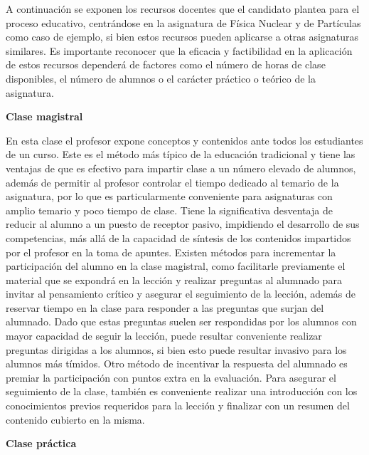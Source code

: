 \documentclass[a4paper,12pt,twoside]{article}
\begin{document}
A continuación se exponen los recursos docentes que el candidato plantea para el proceso educativo, centrándose en la asignatura de Física Nuclear y de Partículas como caso de ejemplo, si bien estos recursos pueden aplicarse a otras asignaturas similares. Es importante reconocer que la eficacia y factibilidad en la aplicación de estos recursos dependerá de factores como el número de horas de clase disponibles, el número de alumnos o el carácter práctico o teórico de la asignatura.

\textbf{Clase magistral} 

En esta clase el profesor expone conceptos y contenidos ante todos los estudiantes de un curso. Este es el método más típico de la educación tradicional y tiene las ventajas de que es efectivo para impartir clase a un número elevado de alumnos, además de permitir al profesor controlar el tiempo dedicado al temario de la asignatura, por lo que es particularmente conveniente para asignaturas con amplio temario y poco tiempo de clase. Tiene la significativa desventaja de reducir al alumno a un puesto de receptor pasivo, impidiendo el desarrollo de sus competencias, más allá de la capacidad de síntesis de los contenidos impartidos por el profesor en la toma de apuntes. Existen métodos para incrementar la participación del alumno en la clase magistral, como facilitarle previamente el material que se expondrá en la lección y realizar preguntas al alumnado para invitar al pensamiento crítico y asegurar el seguimiento de la lección, además de reservar tiempo en la clase para responder a las preguntas que surjan del alumnado. Dado que estas preguntas suelen ser respondidas por los alumnos con mayor capacidad de seguir la lección, puede resultar conveniente realizar preguntas dirigidas a los alumnos, si bien esto puede resultar invasivo para los alumnos más tímidos. Otro método de incentivar la respuesta del alumnado es premiar la participación con puntos extra en la evaluación. Para asegurar el seguimiento de la clase, también es conveniente realizar una introducción con los conocimientos previos requeridos para la lección y finalizar con un resumen del contenido cubierto en la misma.

\textbf{Clase práctica} 
\end{document}
